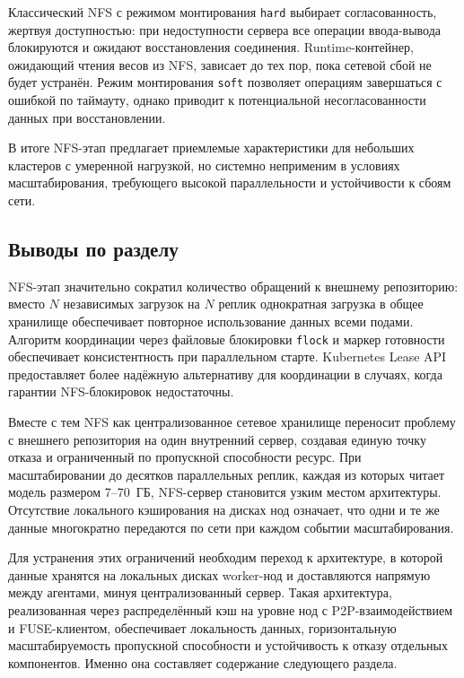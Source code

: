 Классический NFS с режимом монтирования \texttt{hard} выбирает согласованность, жертвуя доступностью: при недоступности сервера все операции ввода-вывода блокируются и ожидают восстановления соединения. Runtime-контейнер, ожидающий чтения весов из NFS, зависает до тех пор, пока сетевой сбой не будет устранён. Режим монтирования \texttt{soft} позволяет операциям завершаться с ошибкой по таймауту, однако приводит к потенциальной несогласованности данных при восстановлении.

В итоге NFS-этап предлагает приемлемые характеристики для небольших кластеров с умеренной нагрузкой, но системно неприменим в условиях масштабирования, требующего высокой параллельности и устойчивости к сбоям сети.

\subsection{Выводы по разделу}

NFS-этап значительно сократил количество обращений к внешнему репозиторию: вместо $N$ независимых загрузок на $N$ реплик однократная загрузка в общее хранилище обеспечивает повторное использование данных всеми подами. Алгоритм координации через файловые блокировки \texttt{flock} и маркер готовности обеспечивает консистентность при параллельном старте. Kubernetes Lease API предоставляет более надёжную альтернативу для координации в случаях, когда гарантии NFS-блокировок недостаточны.

Вместе с тем NFS как централизованное сетевое хранилище переносит проблему с внешнего репозитория на один внутренний сервер, создавая единую точку отказа и ограниченный по пропускной способности ресурс. При масштабировании до десятков параллельных реплик, каждая из которых читает модель размером 7--70~ГБ, NFS-сервер становится узким местом архитектуры. Отсутствие локального кэширования на дисках нод означает, что одни и те же данные многократно передаются по сети при каждом событии масштабирования.

Для устранения этих ограничений необходим переход к архитектуре, в которой данные хранятся на локальных дисках worker-нод и доставляются напрямую между агентами, минуя централизованный сервер. Такая архитектура, реализованная через распределённый кэш на уровне нод с P2P-взаимодействием и FUSE-клиентом, обеспечивает локальность данных, горизонтальную масштабируемость пропускной способности и устойчивость к отказу отдельных компонентов. Именно она составляет содержание следующего раздела.
